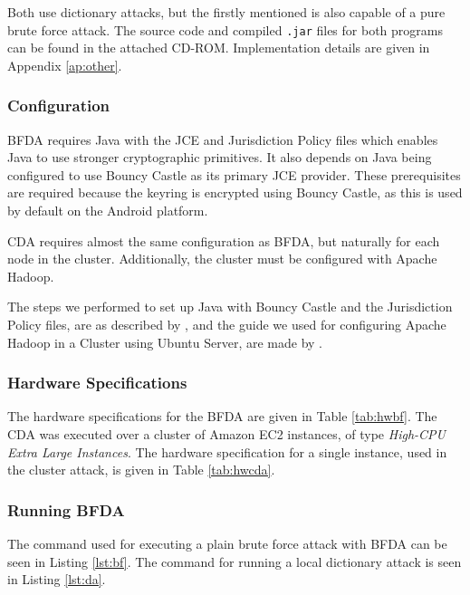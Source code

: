 \documentclass[pdftex,english,10pt,b5paper,twoside]{book}
\begin{document}
Both use dictionary attacks, but the firstly mentioned is also capable of a
pure brute force attack. The source code and compiled \texttt{.jar} files for
both programs can be found in the attached CD-ROM. Implementation details are
given in Appendix \ref{ap:other}.

\subsubsection{Configuration}

\ac{BFDA} requires Java with the \ac{JCE} and Jurisdiction Policy files which
enables Java to use stronger cryptographic primitives. It also depends on Java
being configured to use Bouncy Castle as its primary \ac{JCE} provider. These
prerequisites are required because the keyring is encrypted using Bouncy
Castle, as this is used by default on the Android platform.

\ac{CDA} requires almost the same configuration as \ac{BFDA}, but naturally for
each node in the cluster. Additionally, the cluster must be configured with
Apache Hadoop.

The steps we performed to set up Java with Bouncy Castle and the Jurisdiction
Policy files, are as described by \citet{jce+bc}, and the guide we used for
configuring Apache Hadoop in a Cluster using Ubuntu Server, are made by
\citet{cluster}.

\subsubsection{Hardware Specifications}

The hardware specifications for the \acl{BFDA} are given in Table
\ref{tab:hwbf}. The \acl{CDA} was executed over a cluster of Amazon \ac{EC2}
instances, of type \emph{High-CPU Extra Large Instances}. The hardware
specification for a single instance, used in the cluster attack, is given in
Table \ref{tab:hwcda}.




\subsubsection{Running \ac{BFDA}}

The command used for executing a plain brute force attack with \ac{BFDA} can be
seen in Listing \ref{lst:bf}. The command for running a local dictionary attack
is seen in Listing \ref{lst:da}.
\end{document}
